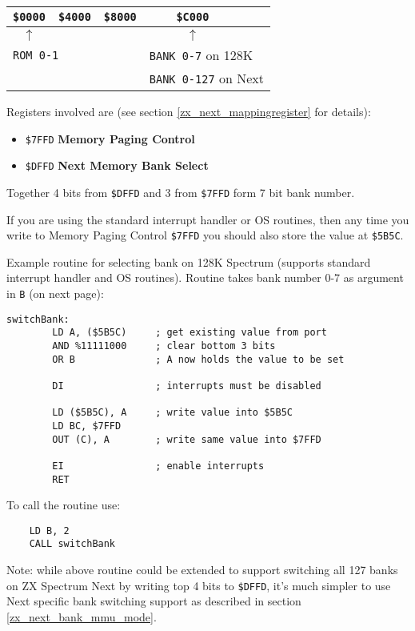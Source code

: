 \documentclass[12pt,twoside,openright,a4paper]{book}
\begin{document}
\begin{tabular}{ccccl}
	{\tt \$0000} & {\tt \$4000} & {\tt \$8000} & {\tt \$C000} & \\
	\hline
	$\uparrow$ & & & $\uparrow$ & \\
	\multicolumn{2}{l}{\tt ROM 0-1} & & \multicolumn{2}{l}{{\tt BANK 0-7} on 128K} \\
	& & & \multicolumn{2}{l}{{\tt BANK 0-127} on Next} \\
\end{tabular}

Registers involved are (see section \ref{zx_next_mappingregister} for details):

\begin{itemize}
	\item {\tt \$7FFD} \textbf{Memory Paging Control}
	\item {\tt \$DFFD} \textbf{Next Memory Bank Select}
\end{itemize}

Together 4 bits from {\tt \$DFFD} and 3 from {\tt \$7FFD} form 7 bit bank number.

If you are using the standard interrupt handler or OS routines, then any time you write to Memory Paging Control {\tt \$7FFD} you should also store the value at {\tt \$5B5C}.

Example routine for selecting bank on 128K Spectrum (supports standard interrupt handler and OS routines). Routine takes bank number 0-7 as argument in {\tt B} (on next page):

\begin{Verbatim}[gobble=1]
	switchBank:
		LD A, ($5B5C)     ; get existing value from port
		AND %11111000     ; clear bottom 3 bits
		OR B              ; A now holds the value to be set

		DI                ; interrupts must be disabled

		LD ($5B5C), A     ; write value into $5B5C
		LD BC, $7FFD
		OUT (C), A        ; write same value into $7FFD

		EI                ; enable interrupts
		RET
\end{Verbatim}

To call the routine use:

\begin{Verbatim}
	LD B, 2
	CALL switchBank
\end{Verbatim}

Note: while above routine could be extended to support switching all 127 banks on ZX Spectrum Next by writing top 4 bits to {\tt \$DFFD}, it's much simpler to use Next specific bank switching support as described in section \ref{zx_next_bank_mmu_mode}.
\end{document}
